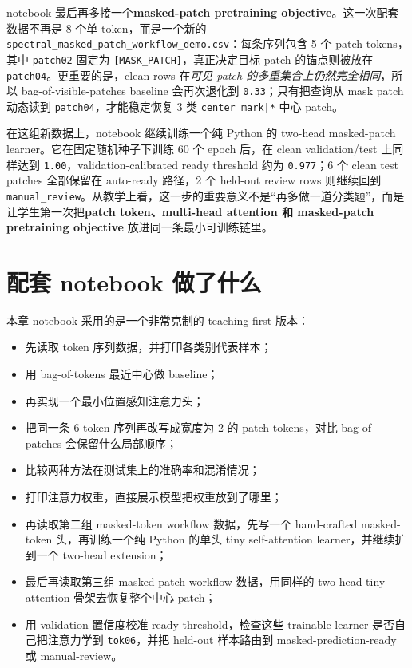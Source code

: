 notebook 最后再多接一个\textbf{masked-patch pretraining objective}。这一次配套数据不再是 8 个单 token，而是一个新的 \texttt{spectral\_masked\_patch\_workflow\_demo.csv}：每条序列包含 5 个 patch tokens，其中 \texttt{patch02} 固定为 \texttt{[MASK\_PATCH]}，真正决定目标 patch 的锚点则被放在 \texttt{patch04}。更重要的是，clean rows 在\emph{可见 patch 的多重集合上仍然完全相同}，所以 bag-of-visible-patches baseline 会再次退化到 \texttt{0.33}；只有把查询从 mask patch 动态读到 \texttt{patch04}，才能稳定恢复 3 类 \texttt{center\_mark|*} 中心 patch。

在这组新数据上，notebook 继续训练一个纯 Python 的 two-head masked-patch learner。它在固定随机种子下训练 60 个 epoch 后，在 clean validation/test 上同样达到 \texttt{1.00}，validation-calibrated ready threshold 约为 \texttt{0.977}；6 个 clean test patches 全部保留在 auto-ready 路径，2 个 held-out review rows 则继续回到 \texttt{manual\_review}。从教学上看，这一步的重要意义不是“再多做一道分类题”，而是让学生第一次把\textbf{patch token、multi-head attention 和 masked-patch pretraining objective} 放进同一条最小可训练链里。

\section{配套 notebook 做了什么}

本章 notebook 采用的是一个非常克制的 teaching-first 版本：

\begin{itemize}
    \item 先读取 token 序列数据，并打印各类别代表样本；
    \item 用 bag-of-tokens 最近中心做 baseline；
    \item 再实现一个最小位置感知注意力头；
    \item 把同一条 6-token 序列再改写成宽度为 2 的 patch tokens，对比 bag-of-patches 会保留什么局部顺序；
    \item 比较两种方法在测试集上的准确率和混淆情况；
    \item 打印注意力权重，直接展示模型把权重放到了哪里；
    \item 再读取第二组 masked-token workflow 数据，先写一个 hand-crafted masked-token 头，再训练一个纯 Python 的单头 tiny self-attention learner，并继续扩到一个 two-head extension；
    \item 最后再读取第三组 masked-patch workflow 数据，用同样的 two-head tiny attention 骨架去恢复整个中心 patch；
    \item 用 validation 置信度校准 ready threshold，检查这些 trainable learner 是否自己把注意力学到 \texttt{tok06}，并把 held-out 样本路由到 masked-prediction-ready 或 manual-review。
\end{itemize}

